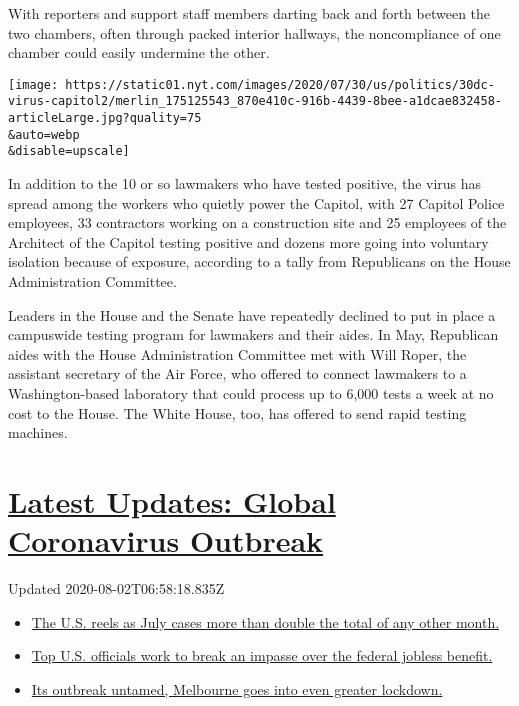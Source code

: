 With reporters and support staff members darting back and forth between
the two chambers, often through packed interior hallways, the
noncompliance of one chamber could easily undermine the other.

\texttt{[image: https://static01.nyt.com/images/2020/07/30/us/politics/30dc-virus-capitol2/merlin\_175125543\_870e410c-916b-4439-8bee-a1dcae832458-articleLarge.jpg?quality=75\\\&auto=webp\\\&disable=upscale]}

In addition to the 10 or so lawmakers who have tested positive, the
virus has spread among the workers who quietly power the Capitol, with
27 Capitol Police employees, 33 contractors working on a construction
site and 25 employees of the Architect of the Capitol testing positive
and dozens more going into voluntary isolation because of exposure,
according to a tally from Republicans on the House Administration
Committee.

Leaders in the House and the Senate have repeatedly declined to put in
place a campuswide testing program for lawmakers and their aides. In
May, Republican aides with the House Administration Committee met with
Will Roper, the assistant secretary of the Air Force, who offered to
connect lawmakers to a Washington-based laboratory that could process up
to 6,000 tests a week at no cost to the House. The White House, too, has
offered to send rapid testing machines.

\hypertarget{latest-updates-global-coronavirus-outbreak}{%
\section{\texorpdfstring{\href{https://www.nytimes.com/2020/08/01/world/coronavirus-covid-19.html?action=click\&pgtype=Article\&state=default\&region=MAIN_CONTENT_1\&context=storylines_live_updates}{Latest
Updates: Global Coronavirus
Outbreak}}{Latest Updates: Global Coronavirus Outbreak}}\label{latest-updates-global-coronavirus-outbreak}}

Updated 2020-08-02T06:58:18.835Z

\begin{itemize}
\tightlist
\item
  \href{https://www.nytimes.com/2020/08/01/world/coronavirus-covid-19.html?action=click\&pgtype=Article\&state=default\&region=MAIN_CONTENT_1\&context=storylines_live_updates\#link-34047410}{The
  U.S. reels as July cases more than double the total of any other
  month.}
\item
  \href{https://www.nytimes.com/2020/08/01/world/coronavirus-covid-19.html?action=click\&pgtype=Article\&state=default\&region=MAIN_CONTENT_1\&context=storylines_live_updates\#link-780ec966}{Top
  U.S. officials work to break an impasse over the federal jobless
  benefit.}
\item
  \href{https://www.nytimes.com/2020/08/01/world/coronavirus-covid-19.html?action=click\&pgtype=Article\&state=default\&region=MAIN_CONTENT_1\&context=storylines_live_updates\#link-2bc8948}{Its
  outbreak untamed, Melbourne goes into even greater lockdown.}
\end{itemize}

